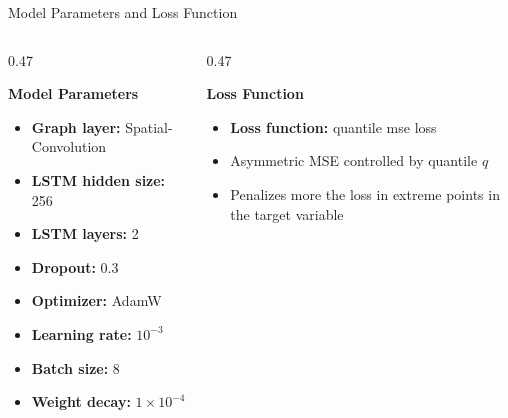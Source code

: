 \documentclass[aspectratio=169]{beamer}
\begin{document}
\begin{frame}{Model Parameters and Loss Function}

\begin{columns}[T]

\begin{column}{0.47\textwidth}

\textbf{Model Parameters}

\begin{itemize}
    \item \textbf{Graph layer:} Spatial-Convolution
    \item \textbf{LSTM hidden size:} 256
    \item \textbf{LSTM layers:} 2
    \item \textbf{Dropout:} 0.3
    \item \textbf{Optimizer:} AdamW
    \item \textbf{Learning rate:} $10^{-3}$
    \item \textbf{Batch size:} 8
    \item \textbf{Weight decay:} $1\times10^{-4}$
\end{itemize}

\end{column}

\begin{column}{0.47\textwidth}

\textbf{Loss Function}

\vspace{0.3cm}

\begin{itemize}
    \item \textbf{Loss function:} quantile mse loss
\end{itemize}

\begin{center}
\end{center}


\vspace{0.3cm}

\begin{itemize}
    \item Asymmetric MSE controlled by quantile $q$
    \item Penalizes more the loss in extreme points in the target variable
\end{itemize}

\end{column}

\end{columns}

\end{frame}
\end{document}
